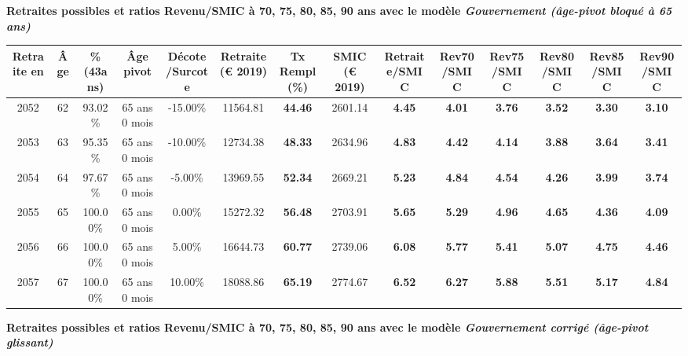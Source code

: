 {\bf \noindent Retraites possibles et ratios Revenu/SMIC à 70, 75, 80, 85, 90 ans avec le modèle \emph{Gouvernement (âge-pivot bloqué à 65 ans)}}  
 
\begin{adjustbox}{max width=\textwidth} 
\begin{tabular}[htb]{|c|c||c|c|c||c|c||c||c|c|c|c|c|c|} 
\hline 
 Retraite en &  Âge &  \%(43ans) &  Âge pivot &  Décote/Surcote &  Retraite (\euro{} 2019) &  Tx Rempl(\%) &  SMIC (\euro{} 2019) &  Retraite/SMIC &  Rev70/SMIC &  Rev75/SMIC &  Rev80/SMIC &  Rev85/SMIC &  Rev90/SMIC \\ 
\hline \hline 
 2052 &  62 &  93.02\% &  65 ans 0 mois &  -15.00\% &  11564.81 &  {\bf 44.46} &  2601.14 &  {\bf 4.45} &  {\bf 4.01} &  {\bf 3.76} &  {\bf 3.52} &  {\bf 3.30} &  {\bf 3.10} \\ 
\hline 
 2053 &  63 &  95.35\% &  65 ans 0 mois &  -10.00\% &  12734.38 &  {\bf 48.33} &  2634.96 &  {\bf 4.83} &  {\bf 4.42} &  {\bf 4.14} &  {\bf 3.88} &  {\bf 3.64} &  {\bf 3.41} \\ 
\hline 
 2054 &  64 &  97.67\% &  65 ans 0 mois &  -5.00\% &  13969.55 &  {\bf 52.34} &  2669.21 &  {\bf 5.23} &  {\bf 4.84} &  {\bf 4.54} &  {\bf 4.26} &  {\bf 3.99} &  {\bf 3.74} \\ 
\hline 
 2055 &  65 &  100.00\% &  65 ans 0 mois &  0.00\% &  15272.32 &  {\bf 56.48} &  2703.91 &  {\bf 5.65} &  {\bf 5.29} &  {\bf 4.96} &  {\bf 4.65} &  {\bf 4.36} &  {\bf 4.09} \\ 
\hline 
 2056 &  66 &  100.00\% &  65 ans 0 mois &  5.00\% &  16644.73 &  {\bf 60.77} &  2739.06 &  {\bf 6.08} &  {\bf 5.77} &  {\bf 5.41} &  {\bf 5.07} &  {\bf 4.75} &  {\bf 4.46} \\ 
\hline 
 2057 &  67 &  100.00\% &  65 ans 0 mois &  10.00\% &  18088.86 &  {\bf 65.19} &  2774.67 &  {\bf 6.52} &  {\bf 6.27} &  {\bf 5.88} &  {\bf 5.51} &  {\bf 5.17} &  {\bf 4.84} \\ 
\hline 
\hline 
\end{tabular} 
\end{adjustbox} 
 
 \vspace{0.1cm} 
{\bf \noindent Retraites possibles et ratios Revenu/SMIC à 70, 75, 80, 85, 90 ans avec le modèle \emph{Gouvernement corrigé (âge-pivot glissant)}}  
 
